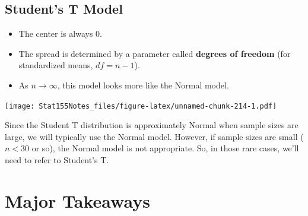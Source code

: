 \documentclass[]{book}
\providecommand{\tightlist}{%
  \setlength{\itemsep}{0pt}\setlength{\parskip}{0pt}}
\begin{document}
\hypertarget{students-t-model}{%
\subsection{Student's T Model}\label{students-t-model}}

\begin{itemize}
\tightlist
\item
  The center is always 0.
\item
  The spread is determined by a parameter called \textbf{degrees of freedom} (for standardized means, \(df = n - 1\)).
\item
  As \(n\rightarrow\infty\), this model looks more like the Normal model.
\end{itemize}

\texttt{[image: Stat155Notes\_files/figure-latex/unnamed-chunk-214-1.pdf]}

Since the Student T distribution is approximately Normal when sample sizes are large, we will typically use the Normal model. However, if sample sizes are small (\(n<30\) or so), the Normal model is not appropriate. So, in those rare cases, we'll need to refer to Student's T.

\hypertarget{major-takeaways-4}{%
\section{Major Takeaways}\label{major-takeaways-4}}
\end{document}
